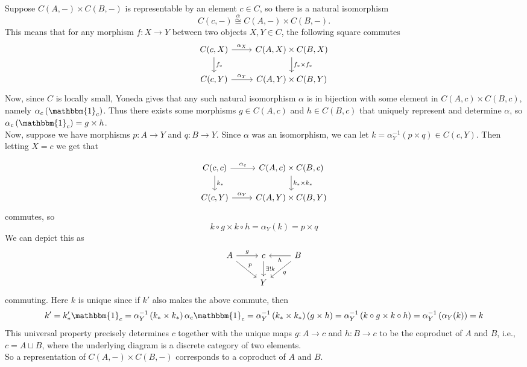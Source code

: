 \documentclass[a4paper]{article}
\begin{document}
    Suppose
    $C\left( A,- \right) \times C\left( B,- \right) $ is representable by
    an element $c \in C$, so there is a natural isomorphism
    \[
        C(c,-) \stackrel{\alpha}{\cong} C(A,-) \times C(B,-).
    \] 
    This means that for any morphism
    $f  \colon X\to Y$ between two objects $X,Y \in C$, the following square commutes
    \begin{equation*} \begin{tikzcd}
        C(c,X) \arrow[r, "\alpha_X"] \arrow[d, "f_*"] & C(A,X) \times C(B,X) \arrow[d,
        "f_* \times f_*"]\\
        C(c,Y) \arrow[r, "\alpha_Y"] & C(A,Y) \times C(B,Y)
    \end{tikzcd}
    \end{equation*}
    Now, since $C$ is locally small, Yoneda gives that
    any such natural isomorphism $\alpha$ is in
    bijection with some element in
    $C(A,c) \times C(B,c)$, namely $\alpha_c \left( \mathbbm{1}_c \right) $.
    Thus there exists some morphisms $g  \in  C(A,c)$ and
    $h \in C(B,c)$ that uniquely represent and determine
    $\alpha$, so $\alpha_c \left( \mathbbm{1}_c \right) 
    = g \times h$.\\
    Now, suppose we have morphisms $p  \colon A \to Y$ and
    $q  \colon B \to Y$. Since $\alpha$ was an isomorphism, we can let
    $k = \alpha_Y^{-1}(p \times q) \in C(c,Y)$. Then letting
    $X = c$ we get that

    \begin{equation*} \begin{tikzcd}
        C(c,c) \arrow[r, "\alpha_c"] \arrow[d, "k_*"] & C(A,c) \times C(B,c) \arrow[d,
        "k_* \times k_*"]\\
        C(c,Y) \arrow[r, "\alpha_Y"] & C(A,Y) \times C(B,Y)
    \end{tikzcd}
    \end{equation*}
    commutes,
    so 
    \[
    k \circ g \times  k \circ h =
    \alpha_Y (k) = p \times q
    \] 
    We can depict this as
    \begin{equation*}
    \begin{tikzcd}
        A \arrow[r, "g"] \arrow[dr, "p"] & c \arrow[d, "\exists ! k"] &  B \arrow[l, "h"]
        \arrow[dl,
        "q"]\\
         & Y &
    \end{tikzcd}
    \end{equation*}
    commuting. Here $k$ is unique since if $k'$ also makes the above commute,
    then
    \[
    k' = k'_{*} \mathbbm{1}_c =
    \alpha_Y^{-1} \left( k_* \times k_* \right) \alpha_c \mathbbm{1}_c
    = \alpha_Y^{-1} \left( k_* \times k_* \right) 
    \left( g \times h \right) 
    = \alpha_Y^{-1} \left( k \circ g \times k \circ h \right) 
= \alpha_Y^{-1} \left( \alpha_Y (k) \right)  = k\]
    This universal property precisely determines
    $c$ together with the unique maps
    $g  \colon A \to c$ and
    $h  \colon B \to c$ to be the coproduct of $A$ and $B$, i.e.,
    $c = A \sqcup B$, where
    the underlying diagram is a discrete category of
    two elements.\\
    So a representation of
    $C(A,-) \times C(B,-)$ corresponds to a coproduct of
    $A$ and $B$.
    
    
    
    
    
    
    

    
    
\end{document}

